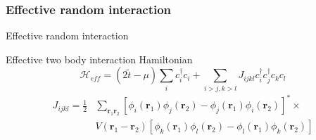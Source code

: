 \subsubsection{Effective random interaction}
\begin{frame}{Effective random interaction}
\begin{block}{Effective two body interaction Hamiltonian}
\begin{equation*}
\mathcal{H}_{eff} = (2\tilde{t} - \mu) \sum_{i} c_{i}^{\dagger} c_{i} + \sum_{i>j,k>l} J_{ijkl} c_{i}^{\dagger} c_{j}^{\dagger} c_{k} c_{l}
\end{equation*}
\vspace{-3mm}
\begin{equation*}
\begin{aligned}
J_{ijkl} = \frac{1}{2} &\sum_{\mathbf{r}_{1}\mathbf{r}_{2}} [\phi_{i}(\mathbf{r}_{1}) \phi_{j}(\mathbf{r}_{2}) - \phi_{j}(\mathbf{r}_{1}) \phi_{i}(\mathbf{r}_{2})]^{*} \times\\
&V(\mathbf{r}_{1}-\mathbf{r}_{2}) [\phi_{k}(\mathbf{r}_{1}) \phi_{l}(\mathbf{r}_{2}) - \phi_{l}(\mathbf{r}_{1}) \phi_{k}(\mathbf{r}_{2})]
\end{aligned}
\end{equation*}
\end{block}


\end{frame}
